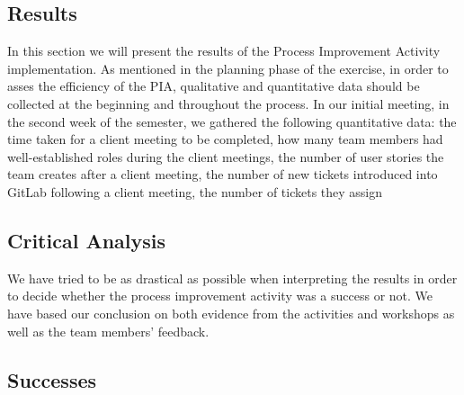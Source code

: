 \documentclass[11pt]{article}
\begin{document}
\subsection*{Results}

\par 
In this section we will present the results of the Process Improvement Activity implementation. As mentioned in the planning phase of the exercise, in order to asses the efficiency of the PIA, qualitative and quantitative data should be collected at the beginning and throughout the process. In our initial meeting, in the second week of the semester, we gathered the following quantitative data: the time taken for a client meeting to be completed, how many team members had well-established roles during the client meetings, the number of user stories the team creates after a client meeting, the number of new tickets introduced into GitLab following a client meeting, the number of tickets they assign  

\par

\subsection*{Critical Analysis}

\par
We have tried to be as drastical as possible when interpreting the results in order to decide whether the process improvement activity was a success or not. We have based our conclusion on both evidence from the activities and workshops as well as the team members' feedback.

\subsection*{Successes}
\end{document}

